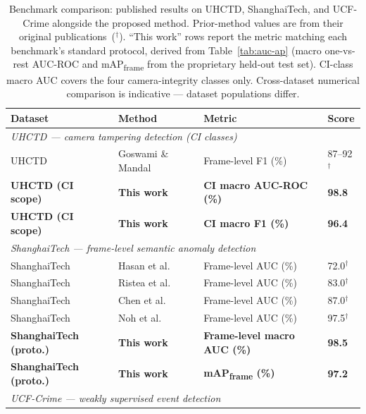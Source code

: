 \documentclass[a4paper,fleqn]{cas-dc}
\begin{document}
\begin{table}[!ht]
\caption[Benchmark comparison on UHCTD, ShanghaiTech, and UCF-Crime]{Benchmark comparison: published results on UHCTD, ShanghaiTech, and UCF-Crime alongside the proposed method. Prior-method values are from their original publications~($^\dagger$). ``This work'' rows report the metric matching each benchmark's standard protocol, derived from Table~\ref{tab:auc-ap} (macro one-vs-rest AUC-ROC and mAP\textsubscript{frame} from the proprietary held-out test set). CI-class macro AUC covers the four camera-integrity classes only. Cross-dataset numerical comparison is indicative — dataset populations differ.}
\label{tab:public-benchmark}
\centering
\scriptsize
\setlength{\tabcolsep}{2.5pt}
\renewcommand{\arraystretch}{1.12}
\begin{tabularx}{\linewidth}{p{2.05cm} p{2.15cm} >{\raggedright\arraybackslash}X p{1.55cm}}
\toprule
\textbf{Dataset} & \textbf{Method} & \textbf{Metric} & \textbf{Score} \\
\midrule
\multicolumn{4}{l}{\textit{UHCTD — camera tampering detection (CI classes)}} \\[2pt]
UHCTD & Goswami \& Mandal~\citep{goswami2023hybrid} & Frame-level F1 (\%) & 87--92$^\dagger$ \\
\textbf{UHCTD (CI scope)} & \textbf{This work} & \textbf{CI macro AUC-ROC (\%)} & \textbf{98.8} \\
\textbf{UHCTD (CI scope)} & \textbf{This work} & \textbf{CI macro F1 (\%)} & \textbf{96.4} \\[5pt]
\multicolumn{4}{l}{\textit{ShanghaiTech — frame-level semantic anomaly detection}} \\[2pt]
ShanghaiTech & Hasan et al.~\citep{hasan2016anomaly}       & Frame-level AUC (\%) & 72.0$^\dagger$ \\
ShanghaiTech & Ristea et al.~\citep{ristea2024selfdistill} & Frame-level AUC (\%) & 83.0$^\dagger$ \\
ShanghaiTech & Chen et al.~\citep{chen2023swintr}          & Frame-level AUC (\%) & 87.0$^\dagger$ \\
ShanghaiTech & Noh et al.~\citep{noh2023global}            & Frame-level AUC (\%) & 97.5$^\dagger$ \\
\textbf{ShanghaiTech (proto.)} & \textbf{This work} & \textbf{Frame-level macro AUC (\%)} & \textbf{98.5} \\
\textbf{ShanghaiTech (proto.)} & \textbf{This work} & \textbf{mAP\textsubscript{frame} (\%)} & \textbf{97.2} \\[5pt]
\multicolumn{4}{l}{\textit{UCF-Crime — weakly supervised event detection}} \\[2pt]

\end{tabularx}
\end{table}
\end{document}
